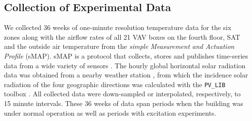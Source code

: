 

\subsection{Collection of Experimental Data}\label{sec:exp_data}
We collected 36 weeks of one-minute resolution temperature data for the six zones along with the airflow rates of all 21 VAV boxes on the fourth floor, SAT and the outside air temperature from the \textit{simple Measurement and Actuation Profile} (sMAP). sMAP is a protocol that collects, stores and publishes time-series data from a wide variety of sensors \cite{smap, Dawson-Haggerty:2012aa}. The hourly global horizontal solar radiation data was obtained from a nearby weather station \cite{SolarRad}, from which the incidence solar radiation of the four geographic directions was calculated with the \texttt{PV\_LIB} toolbox \cite{pv_model}. All collected data were down-sampled or interpolated, respectively, to 15 minute intervals. 
These 36 weeks of data span periods when the building was under normal operation as well as periods with excitation experiments. 

